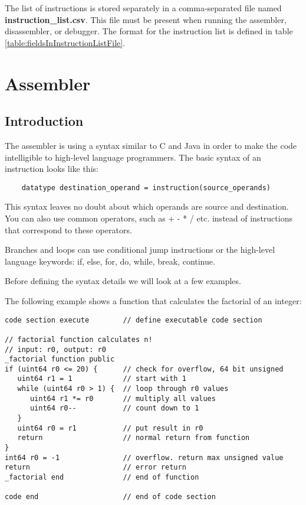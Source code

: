 \documentclass[forwardcom.tex]{subfiles}
\begin{document}
The list of instructions is stored separately in a comma-separated file named \textbf{instruction\_list.csv}. This file must be present when running the assembler, disassembler, or debugger. The format for the instruction list is defined in table \ref{table:fieldsInInstructionListFile}.
\vspace{2mm}


\section{Assembler}\label{chap:assembler}
\subsection{Introduction} \label{assemblerIntroduction}
The assembler is using a syntax similar to C and Java in order to make the code intelligible to 
high-level language programmers. The basic syntax of an instruction looks like this:
\vspace{2mm}

\begin{lstlisting}
    datatype destination_operand = instruction(source_operands)
\end{lstlisting}
\vspace{2mm}

This syntax leaves no doubt about which operands are source and destination. 
You can also use common operators, such as + - * / etc. instead of instructions that correspond
to these operators.
\vspace{2mm}

Branches and loops can use conditional jump instructions or the high-level language keywords:
if, else, for, do, while, break, continue.
\vspace{2mm}

Before defining the syntax details we will look at a few examples.
\vspace{2mm}

The following example shows a function that calculates the factorial of an integer:


\begin{example}
\label{exampleFactorial}
\end{example} %
\begin{lstlisting}[frame=single]
code section execute        // define executable code section

// factorial function calculates n!
// input: r0, output: r0
_factorial function public
if (uint64 r0 <= 20) {      // check for overflow, 64 bit unsigned
   uint64 r1 = 1            // start with 1
   while (uint64 r0 > 1) {  // loop through r0 values
      uint64 r1 *= r0       // multiply all values
      uint64 r0--           // count down to 1
   }
   uint64 r0 = r1           // put result in r0
   return                   // normal return from function
}
int64 r0 = -1               // overflow. return max unsigned value
return                      // error return
_factorial end              // end of function

code end                    // end of code section
\end{lstlisting}
\vspace{4mm}
\end{document}
